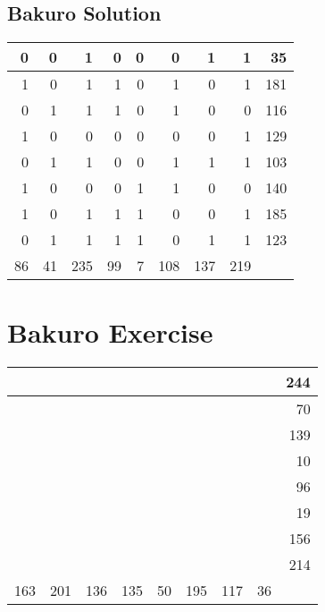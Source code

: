 \documentclass[]{article}
\begin{document}
 \subsection{Bakuro Solution} 
\begin{tabular}{rrrrrrrrr}
\hline
  0 &  0 &   1 &  0 & 0 &   0 &   1 &   1 &  35 \\ \hline
  1 &  0 &   1 &  1 & 0 &   1 &   0 &   1 & 181 \\ \hline
  0 &  1 &   1 &  1 & 0 &   1 &   0 &   0 & 116 \\ \hline
  1 &  0 &   0 &  0 & 0 &   0 &   0 &   1 & 129 \\ \hline
  0 &  1 &   1 &  0 & 0 &   1 &   1 &   1 & 103 \\ \hline
  1 &  0 &   0 &  0 & 1 &   1 &   0 &   0 & 140 \\ \hline
  1 &  0 &   1 &  1 & 1 &   0 &   0 &   1 & 185 \\ \hline
  0 &  1 &   1 &  1 & 1 &   0 &   1 &   1 & 123 \\ \hline
 86 & 41 & 235 & 99 & 7 & 108 & 137 & 219 &     \\ \hline
\hline
\end{tabular}\newpage\section{Bakuro Exercise}\begin{tabular}{rrrrrrrrr}
\hline
     &     &     &     &    &     &     &    & 244 \\ \hline
     &     &     &     &    &     &     &    &  70 \\ \hline
     &     &     &     &    &     &     &    & 139 \\ \hline
     &     &     &     &    &     &     &    &  10 \\ \hline
     &     &     &     &    &     &     &    &  96 \\ \hline
     &     &     &     &    &     &     &    &  19 \\ \hline
     &     &     &     &    &     &     &    & 156 \\ \hline
     &     &     &     &    &     &     &    & 214 \\ \hline
 163 & 201 & 136 & 135 & 50 & 195 & 117 & 36 &     \\ \hline
\hline
\end{tabular}\newpage 
\end{document}
